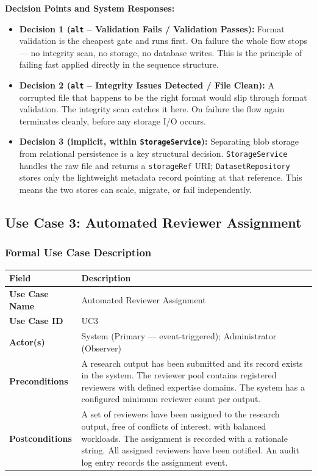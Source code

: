 \documentclass[12pt,a4paper]{article}
\newcommand{\code}[1]{\texttt{\small #1}}
\begin{document}
\noindent\textbf{Decision Points and System Responses:}
\begin{itemize}
  \item \textbf{Decision 1 (\code{alt} -- Validation Fails / Validation Passes):} Format validation is the cheapest gate and runs first. On failure the whole flow stops --- no integrity scan, no storage, no database writes. This is the principle of failing fast applied directly in the sequence structure.
  \item \textbf{Decision 2 (\code{alt} -- Integrity Issues Detected / File Clean):} A corrupted file that happens to be the right format would slip through format validation. The integrity scan catches it here. On failure the flow again terminates cleanly, before any storage I/O occurs.
  \item \textbf{Decision 3 (implicit, within \code{StorageService}):} Separating blob storage from relational persistence is a key structural decision. \code{StorageService} handles the raw file and returns a \code{storageRef} URI; \code{DatasetRepository} stores only the lightweight metadata record pointing at that reference. This means the two stores can scale, migrate, or fail independently.
\end{itemize}

\subsection{Use Case 3: Automated Reviewer Assignment}

\subsubsection{Formal Use Case Description}

\begin{center}
\begin{tabularx}{\textwidth}{@{}lL@{}}
  \toprule
  \textbf{Field} & \textbf{Description} \\
  \midrule
  \textbf{Use Case Name}  & Automated Reviewer Assignment \\
  \textbf{Use Case ID}    & UC3 \\
  \textbf{Actor(s)}       & System (Primary --- event-triggered); Administrator (Observer) \\
  \textbf{Preconditions}  & A research output has been submitted and its record exists in the system. The reviewer pool contains registered reviewers with defined expertise domains. The system has a configured minimum reviewer count per output. \\
  \textbf{Postconditions} & A set of reviewers have been assigned to the research output, free of conflicts of interest, with balanced workloads. The assignment is recorded with a rationale string. All assigned reviewers have been notified. An audit log entry records the assignment event. \\
  \bottomrule
\end{tabularx}
\end{center}
\end{document}
